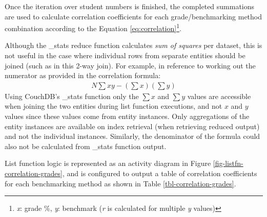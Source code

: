 Once the iteration over student numbers is finished, the completed summations are used to calculate correlation coefficients for each grade/benchmarking method combination according to the Equation \ref{eq:correlation}\footnote{\textit{x}: grade \%, \textit{y}: benchmark (\textit{r} is calculated for multiple \textit{y} values)}.

Although the \_stats reduce function calculates \textit{sum of squares} per dataset, this is not useful in the case where individual rows from separate entities should be joined (such as in this 2-way join). For example, in reference to working out the numerator as provided in the correlation formula:
\begin{align}
    N\sum{xy} - (\sum{x})(\sum{y})
\end{align}
Using CouchDB's \_stats function only the $\sum{x}$ and $\sum{y}$ values are accessible when joining the two entities during list function executions, and not $x$ and $y$ values since these values come from entity instances. Only aggregations of the entity instances are available on index retrieval (when retrieving reduced output) and not the individual instances. Similarly, the denominator of the formula could also not be calculated from \_stats function output.

List function logic is represented as an activity diagram in Figure \ref{fig-listfn-correlation-grades}, and is configured to output a table of correlation coefficients for each benchmarking method as shown in Table \ref{tbl-correlation-grades}.

